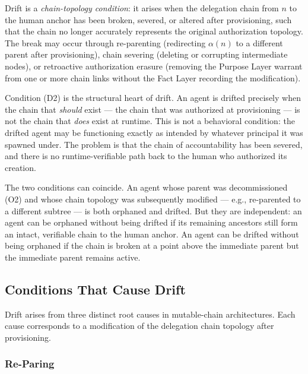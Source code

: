 Drift is a \emph{chain-topology condition}: it arises when the delegation chain from $n$ to the human anchor has been broken, severed, or altered after provisioning, such that the chain no longer accurately represents the original authorization topology. The break may occur through re-parenting (redirecting $\alpha(n)$ to a different parent after provisioning), chain severing (deleting or corrupting intermediate nodes), or retroactive authorization erasure (removing the Purpose Layer warrant from one or more chain links without the Fact Layer recording the modification).

Condition (D2) is the structural heart of drift. An agent is drifted precisely when the chain that \emph{should} exist — the chain that was authorized at provisioning — is not the chain that \emph{does} exist at runtime. This is not a behavioral condition: the drifted agent may be functioning exactly as intended by whatever principal it was spawned under. The problem is that the chain of accountability has been severed, and there is no runtime-verifiable path back to the human who authorized its creation.

The two conditions can coincide. An agent whose parent was decommissioned (O2) and whose chain topology was subsequently modified — e.g., re-parented to a different subtree — is both orphaned and drifted. But they are independent: an agent can be orphaned without being drifted if its remaining ancestors still form an intact, verifiable chain to the human anchor. An agent can be drifted without being orphaned if the chain is broken at a point above the immediate parent but the immediate parent remains active.

\subsection{Conditions That Cause Drift}
\label{sec:drift-causes}

Drift arises from three distinct root causes in mutable-chain architectures. Each cause corresponds to a modification of the delegation chain topology after provisioning.

\subsubsection{Re-Paring}
\label{sec:re-parenting}

